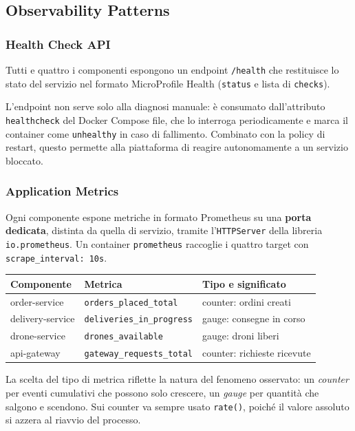 \documentclass[12pt,a4paper]{article}
\begin{document}
\subsection{Observability Patterns}

\subsubsection{Health Check API}
\label{sec:healthcheck}

Tutti e quattro i componenti espongono un endpoint \texttt{/health} che restituisce lo stato del
servizio nel formato MicroProfile Health (\texttt{status} e lista di \texttt{checks}).

L'endpoint non serve solo alla diagnosi manuale: \`e consumato dall'attributo \texttt{healthcheck}
del Docker Compose file, che lo interroga periodicamente e marca il container come
\texttt{unhealthy} in caso di fallimento. Combinato con la policy di restart, questo permette alla
piattaforma di reagire autonomamente a un servizio bloccato.

\subsubsection{Application Metrics}

Ogni componente espone metriche in formato Prometheus su una \textbf{porta dedicata}, distinta da
quella di servizio, tramite l'\texttt{HTTPServer} della libreria \texttt{io.prometheus}. Un
container \texttt{prometheus} raccoglie i quattro target con \texttt{scrape\_interval: 10s}.

\begin{table}[H]
\centering
\begin{tabularx}{\textwidth}{llX}
\toprule
\textbf{Componente} & \textbf{Metrica} & \textbf{Tipo e significato} \\
\midrule
order-service & \texttt{orders\_placed\_total} & counter: ordini creati \\
delivery-service & \texttt{deliveries\_in\_progress} & gauge: consegne in corso \\
drone-service & \texttt{drones\_available} & gauge: droni liberi \\
api-gateway & \texttt{gateway\_requests\_total} & counter: richieste ricevute \\
\bottomrule
\end{tabularx}
\end{table}

La scelta del tipo di metrica riflette la natura del fenomeno osservato: un \emph{counter} per
eventi cumulativi che possono solo crescere, un \emph{gauge} per quantit\`a che salgono e scendono.
Sui counter va sempre usato \texttt{rate()}, poich\'e il valore assoluto si azzera al riavvio del
processo.
\end{document}
